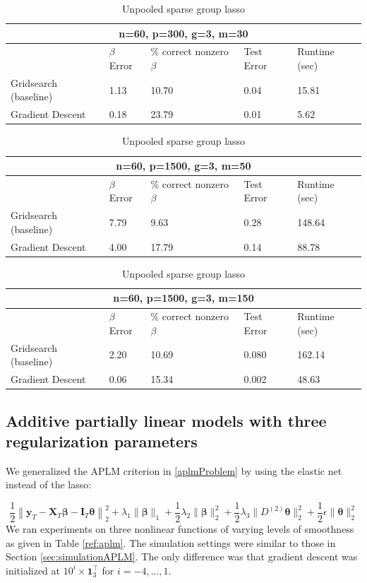 \documentclass[10pt,letterpaper]{article}
\begin{document}
\begin{table}
\begin{center}
\begin{tabular}{| l | l | l | l | l | }
\hline
\multicolumn{5}{|c|}{n=60, p=300, g=3, m=30}\\
\hline
 & $\beta$ Error & \% correct nonzero $\beta$ & Test Error & Runtime (sec) \\
\hline
Gridsearch (baseline) & 1.13 & 10.70 & 0.04 & 15.81 \\
\hline
Gradient Descent & 0.18 & 23.79 & 0.01 & 5.62 \\
\hline
\end{tabular}

\begin{tabular}{| l | l | l | l | l | }
\hline
\multicolumn{5}{|c|}{n=60, p=1500, g=3, m=50}\\
\hline
 & $\beta$ Error & \% correct nonzero $\beta$ & Test Error & Runtime (sec) \\
\hline
Gridsearch (baseline) & 7.79 & 9.63 & 0.28 & 148.64 \\
\hline
Gradient Descent & 4.00 & 17.79 & 0.14 & 88.78 \\
\hline
\end{tabular}

\begin{tabular}{| l | l | l | l | l | }
\hline
\multicolumn{5}{|c|}{n=60, p=1500, g=3, m=150}\\
\hline
 & $\beta$ Error & \% correct nonzero $\beta$ & Test Error & Runtime (sec) \\
\hline
Gridsearch (baseline) & 2.20 & 10.69 & 0.080 & 162.14 \\
\hline
Gradient Descent & 0.06 & 15.34 & 0.002 & 48.63 \\
\hline
\end{tabular}
\end{center}
\caption {Unpooled sparse group lasso}
\label{table:unpooled}
\end{table}

\subsection{Additive partially linear models with three regularization parameters}
We generalized the APLM criterion in \eqref{aplmProblem} by using the elastic net instead of the lasso:

\begin{equation}
\frac{1}{2} \left \|
\boldsymbol{y}_T
- \boldsymbol{X}_T\boldsymbol{\beta}
- \boldsymbol{I}_T \boldsymbol{\theta} \right \|^2_2
+ \lambda_1 \| \boldsymbol \beta \|_1
+ \frac{1}{2} \lambda_2 \| \boldsymbol \beta \|_2^2
+ \frac{1}{2} \lambda_3 \| D^{(2)} \boldsymbol \theta \|_2^2
+ \frac{1}{2} \epsilon \| \boldsymbol{\theta} \|_2^2
\end{equation}
We ran experiments on three nonlinear functions of varying levels of smoothness as given in Table \ref{ref:aplm}. The simulation settings were similar to those in Section \ref{sec:simulationAPLM}. The only difference was that gradient descent was initialized at $10^i \times \boldsymbol 1_3^\top$ for $i=-4, ..., 1$.
\end{document}
